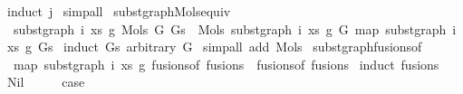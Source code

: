 \begin{isabellebody}
%
\isadelimproof
%
\endisadelimproof
%
\isatagproof
{}\isamarkupfalse%
\ {\isacharparenleft}{\kern0pt}induct\ j{\isacharparenright}{\kern0pt}\isanewline
{}\isamarkupfalse%
\ simp{\isacharunderscore}{\kern0pt}all%
\endisatagproof
{\isafoldproof}%
%
\isadelimproof
\isanewline
%
\endisadelimproof
\isanewline
\isanewline
{}\isamarkupfalse%
\ subst{\isacharunderscore}{\kern0pt}graph{\isacharunderscore}{\kern0pt}Mols{}{\isacharunderscore}{\kern0pt}equiv{\isacharcolon}{\kern0pt}\isanewline
\ \ {\isachardoublequoteopen}subst{\isacharunderscore}{\kern0pt}graph\ i\ xs\ g{}\ {\isacharparenleft}{\kern0pt}Mols{}\ G\ Gs{\isacharparenright}{\kern0pt}\ {\isacharequal}{\kern0pt}\ Mols{}\ {\isacharparenleft}{\kern0pt}subst{\isacharunderscore}{\kern0pt}graph\ i\ xs\ g{}\ G{\isacharparenright}{\kern0pt}\ {\isacharparenleft}{\kern0pt}map\ {\isacharparenleft}{\kern0pt}subst{\isacharunderscore}{\kern0pt}graph\ i\ xs\ g{}{\isacharparenright}{\kern0pt}\ Gs{\isacharparenright}{\kern0pt}{\isachardoublequoteclose}\isanewline
%
\isadelimproof
%
\endisadelimproof
%
\isatagproof
{}\isamarkupfalse%
\ {\isacharparenleft}{\kern0pt}induct\ Gs\ arbitrary{\isacharcolon}{\kern0pt}\ G{\isacharparenright}{\kern0pt}\isanewline
{}\isamarkupfalse%
\ {\isacharparenleft}{\kern0pt}simp{\isacharunderscore}{\kern0pt}all\ add{\isacharcolon}{\kern0pt}\ Mols{}{\isacharparenright}{\kern0pt}%
\endisatagproof
{\isafoldproof}%
%
\isadelimproof
\isanewline
%
\endisadelimproof
\isanewline
\isanewline
{}\isamarkupfalse%
\ subst{\isacharunderscore}{\kern0pt}graph{\isacharunderscore}{\kern0pt}fusions{\isacharunderscore}{\kern0pt}of{\isacharcolon}{\kern0pt}\isanewline
\ \ {\isachardoublequoteopen}map\ {\isacharparenleft}{\kern0pt}subst{\isacharunderscore}{\kern0pt}graph\ i\ xs\ g{}{\isacharparenright}{\kern0pt}\ {\isacharparenleft}{\kern0pt}fusions{\isacharunderscore}{\kern0pt}of\ fusions{\isacharparenright}{\kern0pt}\ {\isacharequal}{\kern0pt}\ fusions{\isacharunderscore}{\kern0pt}of\ fusions{\isachardoublequoteclose}\isanewline
%
\isadelimproof
%
\endisadelimproof
%
\isatagproof
{}\isamarkupfalse%
\ {\isacharparenleft}{\kern0pt}induct\ fusions{\isacharparenright}{\kern0pt}\isanewline
\ \ \isamarkupfalse%
\ Nil\isanewline
\ \ \isamarkupfalse%
\ \isamarkupfalse%
\ {\isacharquery}{\kern0pt}case\isanewline
\ \ \isamarkupfalse%

\end{isabellebody}
